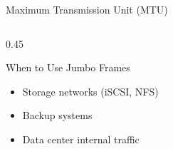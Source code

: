 \documentclass[aspectratio=169]{beamer}  %
\begin{document}
\begin{frame}{Maximum Transmission Unit (MTU)}
\begin{columns}[T]
\begin{column}{0.45\textwidth}
            \vspace{0.3em}
            \begin{block}{When to Use Jumbo Frames}
                \begin{itemize}
                    \item Storage networks (iSCSI, NFS)
                    \item Backup systems
                    \item Data center internal traffic
                \end{itemize}
            \end{block}
        \end{column}
    \end{columns}
\end{frame}

\end{document}
